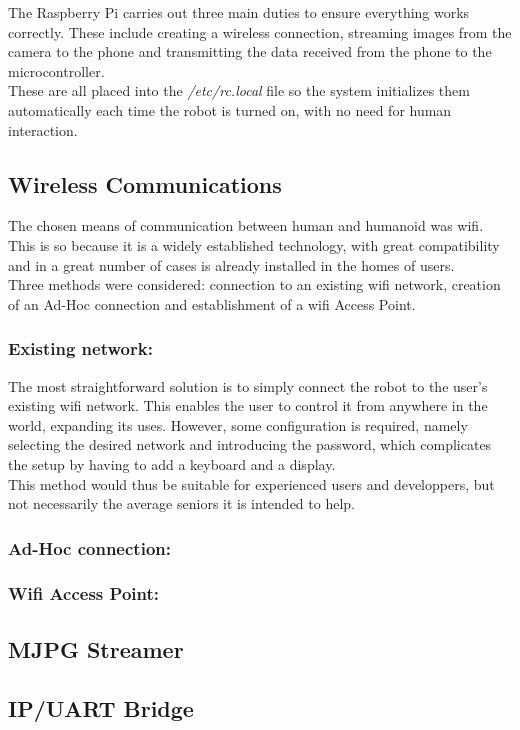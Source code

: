 The Raspberry Pi carries out three main duties to ensure everything works correctly. These include creating a wireless connection, streaming images from the camera to the phone and transmitting the data received from the phone to the microcontroller.\\

 These are all placed into the \textit{/etc/rc.local} file so the system initializes them automatically each time the robot is turned on, with no need for human interaction.

\subsection{Wireless Communications}%

The chosen means of communication between human and humanoid was wifi. This is so because it is a widely established technology, with great compatibility and in a great number of cases is already installed in the homes of users.\\

Three methods were considered: connection to an existing wifi network, creation of an Ad-Hoc connection and establishment of a wifi Access Point.

\subsubsection{Existing network:}

The most straightforward solution is to simply connect the robot to the user's existing wifi network. This enables the user to control it from anywhere in the world, expanding its uses. However, some configuration is required, namely selecting the desired network and introducing the password, which complicates the setup by having to add a keyboard and a display.\\

This method would thus be suitable for experienced users and developpers, but not necessarily the average seniors it is intended to help.

\subsubsection{Ad-Hoc connection:}



\subsubsection{Wifi Access Point:}




\subsection{MJPG Streamer}




\subsection{IP/UART Bridge} 
